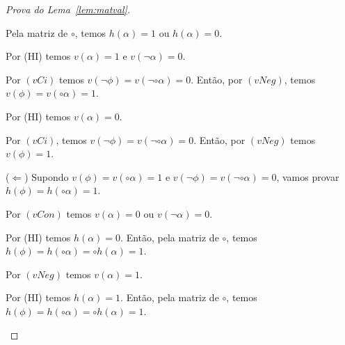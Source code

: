 \begin{proof}[Prova do Lema~\ref{lem:matval}]
\begin{provaporcasos}
\begin{provaporsubcasos}
                        Pela matriz de $\circ$, temos $h(\alpha) = 1$ ou $h(\alpha) = 0$.

                        \begin{provaporsubsubcasos}
                                
                                Por (HI) temos $v(\alpha) = 1$ e $v(\neg \alpha) = 0$.
                            
                                Por $(vCi)$ temos $v(\neg \phi) = v(\neg \circ \alpha) = 0$. Então, por $(vNeg)$, temos $v(\phi) = v(\circ \alpha) = 1$.
                            
                                
                                Por (HI) temos $v(\alpha) = 0$.
                            
                                Por $(vCi)$, temos $v(\neg \phi) = v(\neg \circ \alpha) = 0$. Então, por $(vNeg)$ temos $v(\phi) = 1$.

                                \setcounter{buffer}{\theSubSubCasos}
                        \end{provaporsubsubcasos}
                        
                        ($\Longleftarrow$) Supondo $v(\phi) = v(\circ \alpha) = 1$ e $v(\neg \phi) = v(\neg \circ \alpha) = 0$, vamos provar $h(\phi) = h(\circ \alpha) = 1$.
                        
                        Por $(vCon)$ temos $v(\alpha) = 0$ ou $v(\neg \alpha) = 0$.

                        \begin{provaporsubsubcasos}
                            \setcounter{SubSubCasos}{\thebuffer}


                                Por (HI) temos $h(\alpha) = 0$. Então, pela matriz de $\circ$, temos $h(\phi) = h(\circ \alpha) = \circ h(\alpha) = 1$.
                            

                                Por $(vNeg)$ temos $v(\alpha) = 1$.

                                Por (HI) temos $h(\alpha) = 1$. Então, pela matriz de $\circ$, temos $h(\phi) = h(\circ \alpha) = \circ h(\alpha) = 1$.
                        \end{provaporsubsubcasos}
                        

\end{provaporsubcasos}
\end{provaporcasos}
\end{proof}
